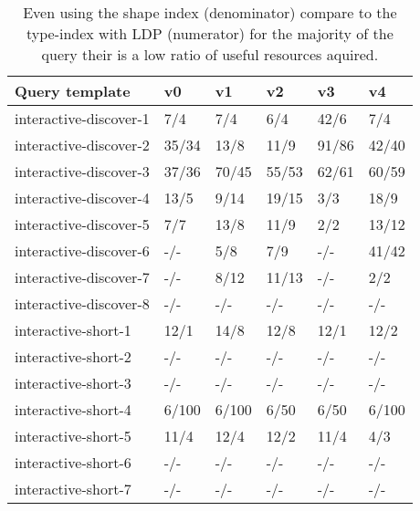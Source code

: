\begin{table}
	\begin{center}
		\begin{tabular}{|l|l|l|l|l|l|}
			\hline
			Query template & v0 & v1 & v2 & v3 & v4 \\
			\hline
			interactive-discover-1 & 7/4 & 7/4 & 6/4 & 42/6 & 7/4 \\
			\hline
			interactive-discover-2 & 35/34 & 13/8 & 11/9 & 91/86 & 42/40 \\
			\hline
			interactive-discover-3 & 37/36 & 70/45 & 55/53 & 62/61 & 60/59 \\
			\hline
			interactive-discover-4 & 13/5 & 9/14 & 19/15 & 3/3 & 18/9 \\
			\hline
			interactive-discover-5 & 7/7 & 13/8 & 11/9 & 2/2 & 13/12 \\
			\hline
			interactive-discover-6 & -/- & 5/8 & 7/9 & -/- & 41/42 \\
			\hline
			interactive-discover-7 & -/- & 8/12 & 11/13 & -/- & 2/2 \\
			\hline
			interactive-discover-8 & -/- & -/- & -/- & -/- & -/- \\
			\hline
			interactive-short-1 & 12/1 & 14/8 & 12/8 & 12/1 & 12/2 \\
			\hline
			interactive-short-2 & -/- & -/- & -/- & -/- & -/- \\
			\hline
			interactive-short-3 & -/- & -/- & -/- & -/- & -/- \\
			\hline
			interactive-short-4 & 6/100 & 6/100 & 6/50 & 6/50 & 6/100 \\
			\hline
			interactive-short-5 & 11/4 & 12/4 & 12/2 & 11/4 & 4/3 \\
			\hline
			interactive-short-6 & -/- & -/- & -/- & -/- & -/- \\
			\hline
			interactive-short-7 & -/- & -/- & -/- & -/- & -/- \\
			\hline
		\end{tabular}
	\end{center}
	\caption{Even using the shape index (denominator) compare to the type-index with LDP (numerator) for the majority of the query their is a low ratio of useful resources aquired.}
	\label{tab:ratioUsefulResources}
\end{table}